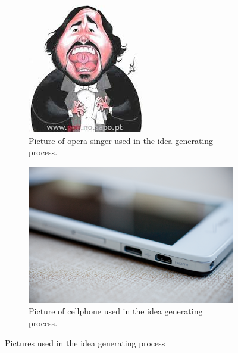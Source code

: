 \begin{figure}[ht]
\centering
  \begin{subfigure}[b]{0.3\textwidth}
    \includegraphics[width=\textwidth]{./graphics/pavarotti}
    \caption{Picture of opera singer used in the idea generating process.}
    \label{fig:pavarotti}
  \end{subfigure}
  \begin{subfigure}[b]{0.3\textwidth}
    \includegraphics[width=\textwidth]{./graphics/phone}
    \caption{Picture of cellphone used in the idea generating process.}
    \label{fig:phone}
  \end{subfigure}
\caption{Pictures used in the idea generating process}
\end{figure}





